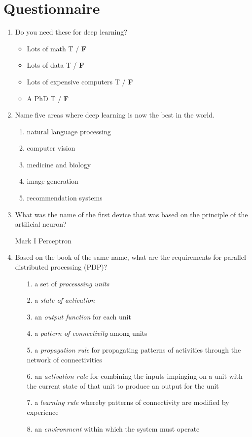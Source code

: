 \documentclass[12pt,a4paper]{article}
\begin{document}
\raggedright

\section*{Questionnaire}

\begin{enumerate}
\item Do you need these for deep learning?
\begin{itemize}
	\item Lots of math T / \textbf{F}
	\item Lots of data T / \textbf{F}
	\item Lots of expensive computers T / \textbf{F}
	\item A PhD T / \textbf{F}
\end{itemize}

\item Name five areas where deep learning is now the best in the world. \\

\begin{enumerate}
	\item natural language processing
	\item computer vision
	\item medicine and biology
	\item image generation
	\item recommendation systems
\end{enumerate}

\item What was the name of the first device that was based on the principle of the artificial neuron? \\

\smallbreak

Mark I Perceptron

\bigbreak

\item Based on the book of the same name, what are the requirements for parallel distributed processing (PDP)? \\

\begin{itemize}
	\item[1.] a set of \textit{processsing units}
	\item[2.] a \textit{state of activation}
	\item[3.] an \textit{output function} for each unit
	\item[4.] a \textit{pattern of connectivity} among units
	\item[5.] a \textit{propagation rule} for propagating patterns of activities through the network of connectivities
	\item[6.] an \textit{activation rule} for combining the inputs impinging on a unit with the current state of that unit to produce an output for the unit
	\item[7.] a \textit{learning rule} whereby patterns of connectivity are modified by experience
	\item[8.] an \textit{environment} within which the system must operate
\end{itemize}


\end{enumerate}
\end{document}
